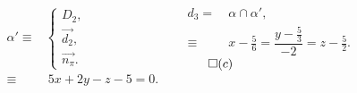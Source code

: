 \documentclass[10pt]{beamer}
\newcommand{\vect}[1] {
  \overrightarrow{#1}}
\begin{document}
{\begin{columns}[c]
		\flushleft 
		\onslide<+->
		\begin{align*}
		\alpha' \equiv& \begin{cases}
		                D_2, \\
		                \vect{d_2}, \\
		                \vect{n_\pi}.
		               \end{cases} \\
		       \equiv&\ 5x +2y -z -5=0.
		\end{align*}
		
		\flushleft 
		\onslide<+->
		\begin{align*}
		 d_3      =&\ \alpha \cap \alpha ', \\
		     \equiv&\ x-\frac{5}{6} = \dfrac{y-\frac{5}{3}}{-2} = z - \frac{5}{2}.
		\end{align*}
		\hfill $\qed(c)$\hspace{-3mm}
		\vspace{-3mm}
		\end{columns}

		

    } 
\end{document}
